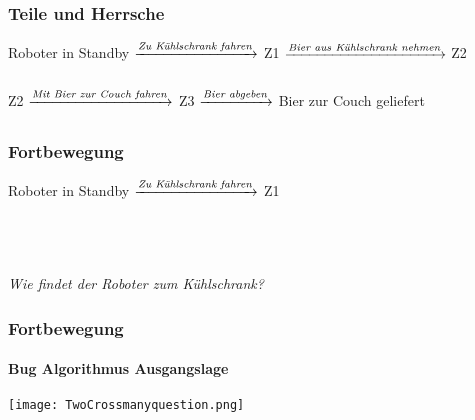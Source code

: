 \documentclass{beamer}
\begin{document}
\begin{frame}
\frametitle{Teile und Herrsche}
\begin{center}





      

Roboter in Standby $\xrightarrow[\text{}]{\text{\textit{Zu Kühlschrank fahren}}}$ Z1 $\xrightarrow[\text{}]{\text{\textit{Bier aus Kühlschrank nehmen}}}$ Z2\\ \quad \\ Z2 $\xrightarrow[\text{}]{\text{\textit{Mit Bier zur Couch fahren}}}$ Z3  $\xrightarrow[\text{}]{\text{\textit{Bier abgeben}}}$  Bier zur Couch geliefert
\end{center}
\end{frame}

\begin{frame}
\frametitle{Fortbewegung}

\begin{block}{}
\begin{center}
Roboter in Standby $\xrightarrow[\text{}]{\text{\textit{Zu Kühlschrank fahren}}}$ Z1 \\
\end{center}
\end{block}
\quad \\
\quad \\
\begin{center}
\textit{Wie findet der Roboter zum Kühlschrank?}
\end{center}
\end{frame}


\begin{frame}
\frametitle{Fortbewegung}
\framesubtitle{Bug Algorithmus Ausgangslage}

\begin{center}
\texttt{[image: TwoCrossmanyquestion.png]}

\end{center}


\end{frame}
\end{document}
